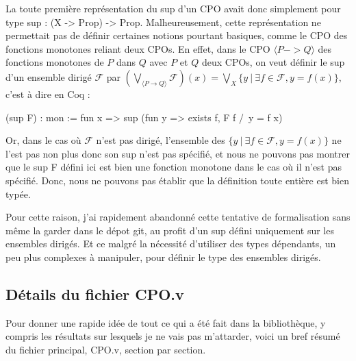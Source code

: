 \documentclass{article}
\newcommand\code[1]{{\fontfamily{lmtt}\selectfont #1}}
\theoremstyle{definition}
\begin{document}
La toute première représentation du sup d'un CPO avait donc simplement pour type \code{sup : (X -> Prop) -> Prop}. Malheureusement, cette représentation ne permettait pas de définir certaines notions pourtant basiques, comme le CPO des fonctions monotones reliant deux CPOs. En effet, dans le CPO $\langle P -> Q \rangle$ des fonctions monotones de $P$ dans $Q$ avec $P$ et $Q$ deux CPOs, on veut définir le sup d'un ensemble dirigé $\mathcal{F}$ par $(\bigvee_{\langle P \rightarrow Q \rangle} \mathcal{F})(x) = \bigvee_{X} \{y ~ | ~ \exists f \in \mathcal{F}, y = f(x)\}$, c'est à dire en Coq :

\begin{coq}
(sup F) : mon := fun x => sup (fun y => exists f, F f /\ y = f x)
\end{coq}

Or, dans le cas où $\mathcal{F}$ n'est pas dirigé, l'ensemble des $\{y ~ | ~ \exists f \in \mathcal{F}, y = f(x)\}$ ne l'est pas non plus donc son sup n'est pas spécifié, et nous ne pouvons pas montrer que le \code{sup F} défini ici est bien une fonction monotone dans le cas où il n'est pas spécifié. Donc, nous ne pouvons pas établir que la définition toute entière est bien typée.

Pour cette raison, j'ai rapidement abandonné cette tentative de formalisation sans même la garder dans le dépot git, au profit d'un sup défini uniquement sur les ensembles dirigés. Et ce malgré la nécessité d'utiliser des types dépendants, un peu plus complexes à manipuler, pour définir le type des ensembles dirigés.



\subsection{Détails du fichier CPO.v}

Pour donner une rapide idée de tout ce qui a été fait dans la bibliothèque, y compris les résultats sur lesquels je ne vais pas m'attarder, voici un bref résumé du fichier principal, \code{CPO.v}, section par section.

\medskip
\end{document}
